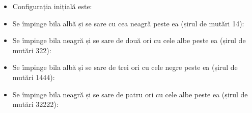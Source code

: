 \begin{itemize}

\item Configurația inițială este:


\item Se împinge bila albă și se sare cu cea neagră peste ea (șirul de mutări
  14):


\item Se împinge bila neagră și se sare de două ori cu cele albe peste ea
  (șirul de mutări 322):


\item Se împinge bila albă și se sare de trei ori cu cele negre peste ea
  (șirul de mutări 1444):


\item Se împinge bila neagră și se sare de patru ori cu cele albe peste ea
  (șirul de mutări 32222):


\end{itemize}
